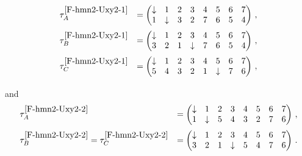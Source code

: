 \documentclass[12pt,a4paper]{amsart}
\theoremstyle{plain} %
\theoremstyle{definition}
\numberwithin{equation}{section}
\numberwithin{figure}{section}
\numberwithin{table}{section}
\begin{document}
{\begin{equation*}
\begin{array}{ll}
\tau^{\ref{F-hmn2-Uxy2-1}}_A  &= \begin{pmatrix}
                       \downarrow &  1 & 2 & 3 & 4 & 5 & 6 & 7 \\
                        1 &  \downarrow & 3 & 2 & 7 & 6 & 5 & 4 \\
                        \end{pmatrix}\,,\\[12pt]
\tau^{\ref{F-hmn2-Uxy2-1}}_B  &= \begin{pmatrix}
                         \downarrow & 1 & 2 & 3 & 4 & 5 & 6 & 7 \\
                          3 & 2 & 1 & \downarrow & 7 & 6 & 5 & 4 \\
                        \end{pmatrix}\,,\\[12pt]
\tau^{\ref{F-hmn2-Uxy2-1}}_C  &= \begin{pmatrix}
                         \downarrow & 1 & 2 & 3 & 4 & 5 & 6 & 7 \\
                          5 & 4 & 3 & 2 & 1 & \downarrow & 7 & 6 \\
                        \end{pmatrix}\,,\\[12pt]
\end{array}%
\end{equation*}
%
and
%
\begin{equation*}
\begin{array}{ll}
\tau^{\ref{F-hmn2-Uxy2-2}}_A  &= \begin{pmatrix}
                        \downarrow &  1 & 2 & 3 & 4 & 5 & 6 & 7 \\
                         1 & \downarrow & 5 & 4 & 3 & 2 & 7 & 6 \\
                        \end{pmatrix}\,,\\[12pt]
\tau^{\ref{F-hmn2-Uxy2-2}}_B = \tau^{\ref{F-hmn2-Uxy2-2}}_C &= \begin{pmatrix}
                         \downarrow & 1 & 2 & 3 & 4 & 5 & 6 & 7 \\
                         3 & 2  & 1 & \downarrow & 5 & 4 & 7 & 6 \\
                        \end{pmatrix}\,.
\end{array}%
\end{equation*}

}
\end{document}
